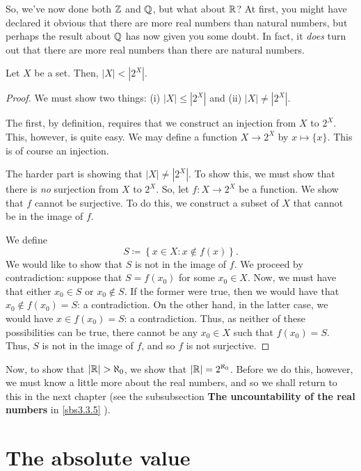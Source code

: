 So, we've now done both $\mathbb{Z}$ and $\mathbb{Q}$, but what about $\mathbb{R}$?  At first, you might have declared it obvious that there are more real numbers than natural numbers, but perhaps the result about $\mathbb{Q}$ has now given you some doubt.  In fact, it \emph{does} turn out that there are more real numbers than there are natural numbers.
\begin{thm}
Let $X$ be a set.  Then, $|X|<|2^X|$.
\begin{proof}
We must show two things:  (i) $|X|\leq |2^X|$ and (ii) $|X|\neq |2^X|$.

The first, by definition, requires that we construct an injection from $X$ to $2^X$.  This, however, is quite easy.  We may define a function $X\rightarrow 2^X$ by $x\mapsto \{ x\}$.  This is of course an injection.

The harder part is showing that $|X|\neq |2^X|$.  To show this, we must show that there is \emph{no} surjection from $X$ to $2^X$.  So, let $f:X\rightarrow 2^X$ be a function.  We show that $f$ cannot be surjective.  To do this, we construct a subset of $X$ that cannot be in the image of $f$.

We define
\begin{equation}
S\coloneqq \left\{ x\in X:x\notin f(x)\right\} .
\end{equation}
We would like to show that $S$ is not in the image of $f$.  We proceed by contradiction:  suppose that $S=f(x_0)$ for some $x_0\in X$.  Now, we must have that either $x_0\in S$ or $x_0\notin S$.  If the former were true, then we would have that $x_0\notin f(x_0)=S$:  a contradiction.  On the other hand, in the latter case, we would have $x\in f(x_0)=S$:  a contradiction.  Thus, as neither of these possibilities can be true, there cannot be any $x_0\in X$ such that $f(x_0)=S$.  Thus, $S$ is not in the image of $f$, and so $f$ is not surjective.
\end{proof}
\end{thm}
Now, to show that $|\R |>\aleph _0$, we show that $|\mathbb{R} |=2^{\aleph _0}$.  Before we do this, however, we must know a little more about the real numbers, and so we shall return to this in the next chapter (see the subsubsection \textbf{The uncountability of the real numbers} in \cref{sbs3.3.5} ).

\section{The absolute value}

